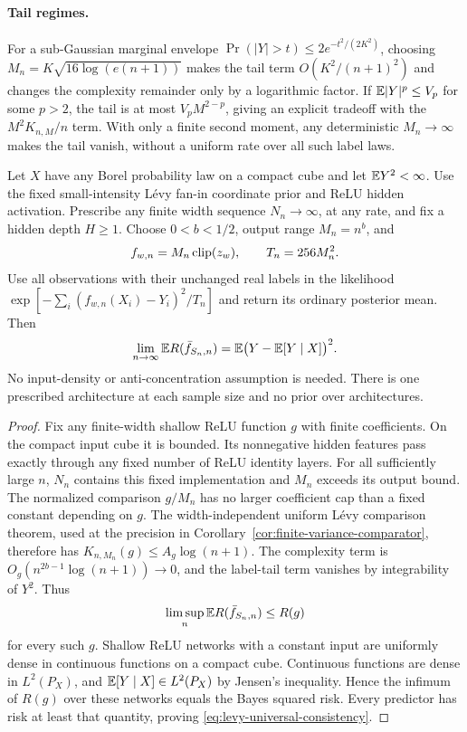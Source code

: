 \paragraph{Tail regimes.}
For a sub-Gaussian marginal envelope
$\Pr(|Y|>t)\le2e^{-t^2/(2K^2)}$, choosing
$M_n=K\sqrt{16\log(e(n+1))}$ makes the tail term
$O(K^2/(n+1)^2)$ and changes the complexity remainder only by a
logarithmic factor. If $\mathbb E|Y|^p\le V_p$ for some $p>2$, the tail is
at most $V_p M^{2-p}$, giving an explicit tradeoff with the
$M^2K_{n,M}/n$ term. With only a finite second moment,
any deterministic $M_n\to\infty$ makes the tail vanish, without a
uniform rate over all such label laws.

\begin{corollary}
\label{cor:levy-universal-consistency}
Let $X$ have any Borel probability law on a compact cube and let
$\mathbb E Y^2<\infty$. Use the fixed small-intensity L\'evy fan-in
coordinate prior and ReLU hidden activation. Prescribe any finite
width sequence $N_n\to\infty$, at any rate, and fix a hidden depth
$H\ge1$. Choose $0<b<1/2$, output range $M_n=n^b$, and
\[
 f_{w,n}=M_n\operatorname{clip}(z_w),\qquad T_n=256M_n^2.
\]
Use all observations with their unchanged real labels in the
likelihood $\exp[-\sum_i(f_{w,n}(X_i)-Y_i)^2/T_n]$ and return its
ordinary posterior mean. Then
\begin{equation}
 \lim_{n\to\infty}\mathbb E R(\bar f_{S_n,n})
 =\mathbb E\bigl(Y-\mathbb E[Y\mid X]\bigr)^2.
 \label{eq:levy-universal-consistency}
\end{equation}
No input-density or anti-concentration assumption is needed.
There is one prescribed architecture at each sample size and no
prior over architectures.
\end{corollary}
\begin{proof}
Fix any finite-width shallow ReLU function $g$ with finite
coefficients. On the compact input cube it is bounded. Its
nonnegative hidden features pass exactly through any fixed number
of ReLU identity layers. For all sufficiently large $n$, $N_n$
contains this fixed implementation and $M_n$ exceeds its output
bound. The normalized comparison $g/M_n$ has no larger coefficient
cap than a fixed constant depending on $g$.
The width-independent uniform L\'evy comparison theorem, used at the
precision in Corollary~\ref{cor:finite-variance-comparator}, therefore
has $K_{n,M_n}(g)\le A_g\log(n+1)$.
The complexity term is
$O_g(n^{2b-1}\log(n+1))\to0$, and the label-tail term vanishes by
integrability of $Y^2$. Thus
\[
 \limsup_n\mathbb E R(\bar f_{S_n,n})\le R(g)
\]
for every such $g$.
Shallow ReLU networks with a constant input are uniformly dense in
continuous functions on a compact cube. Continuous functions are
dense in $L^2(P_X)$, and $\mathbb E[Y\mid X]\in L^2(P_X)$ by Jensen's
inequality. Hence the infimum of $R(g)$ over these networks equals
the Bayes squared risk. Every predictor has risk at least that
quantity, proving \eqref{eq:levy-universal-consistency}.
\end{proof}

